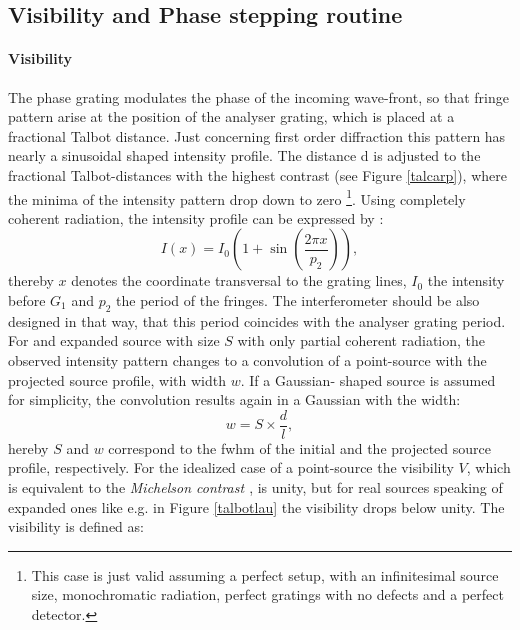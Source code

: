\subsection{Visibility and Phase stepping routine}\label{subsec:stepp}
\paragraph{Visibility} The phase grating modulates the phase of the incoming wave-front, so that fringe pattern arise at the position of the analyser grating, which is placed at a fractional Talbot distance. 
Just concerning first order diffraction \citep{WeitkampPfeiffer2006} this pattern has nearly a sinusoidal shaped intensity profile. The distance d is adjusted to the fractional Talbot-distances with the highest contrast (see Figure \ref{talcarp}), where the minima of the intensity pattern drop down to zero \footnote{This case is just valid assuming a perfect setup, with an infinitesimal source size, monochromatic radiation, perfect gratings with no defects and a perfect detector.}. Using completely coherent radiation, the intensity profile can be expressed by \citep{WeitkampPfeiffer2006}: 
\begin{equation}\label{sinepatt}
I(x) = I_{0}(1+ \sin(\frac{2\pi x}{p_{2}})), 
\end{equation} 
thereby $x$ denotes the coordinate transversal to the grating lines, $I_{0}$ the intensity before $G_{1}$ and $p_{2}$ the period of the fringes. The interferometer should be also designed in that way, that this period coincides with the analyser grating period. For and expanded source with size $S$ with only partial coherent radiation, the observed intensity pattern changes to a convolution of a point-source with the projected source profile, with width $w$. If a Gaussian- shaped source is assumed for simplicity, the convolution results again in a Gaussian with the width:
\begin{equation}\label{projsize}
w = S \times \frac{d}{l},
\end{equation}
hereby $S$ and $w$ correspond to the \gls{fwhm} of the initial and the projected source profile, respectively.  For the idealized case of a point-source the visibility $V$, which is equivalent to the \textit{Michelson contrast \citep{michelson1995studies}}, is unity, but for real sources speaking of expanded ones like e.g. in Figure \ref{talbotlau} the visibility drops below unity. The visibility is defined as: 
